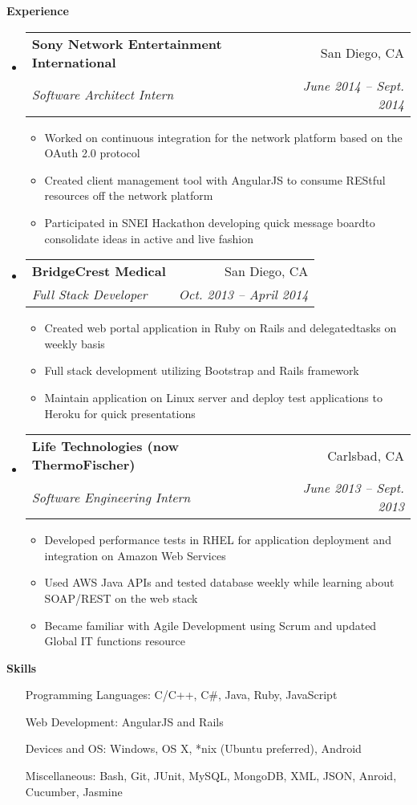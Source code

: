 \documentclass[letterpaper,11pt]{article}
\makeatletter
\newcommand{\resitem}[1]{\item #1 \vspace{-2pt}}
\newcommand{\resheading}[1]{{\large \colorbox{mygrey}{\begin{minipage}{\textwidth}{\textbf{#1 \vphantom{p\^{E}}}}\end{minipage}}}}
\newcommand{\ressubheading}[4]{
\begin{tabular*}{6.5in}{l@{\extracolsep{\fill}}r}
		\textbf{#1} & #2 \\
		\textit{#3} & \textit{#4} \\
\end{tabular*}\vspace{-6pt}}
\makeatother
\begin{document}
\resheading{Experience}
  \begin{itemize}
    \item 
      \ressubheading{Sony Network Entertainment International}{San Diego, CA}{Software Architect Intern}{June 2014 -- Sept. 2014}
      { \footnotesize
        \begin{itemize}
          \resitem{Worked on continuous integration for the network platform based on the OAuth 2.0 protocol}
	  \resitem{Created client management tool with AngularJS to consume REStful resources off the network platform}
          \resitem{Participated in SNEI Hackathon developing quick message boardto consolidate ideas in active and live fashion}
        \end{itemize}
      }
    \item
      \ressubheading{BridgeCrest Medical}{San Diego, CA}{Full Stack Developer}{Oct. 2013 -- April 2014}
      { \footnotesize
        \begin{itemize}
	  \resitem{Created web portal application in Ruby on Rails and delegatedtasks on weekly basis}
	  \resitem{Full stack development utilizing Bootstrap and Rails
framework}	
          \resitem{Maintain application on Linux server and deploy test applications to Heroku for quick presentations}
	\end{itemize}
      }
    \item
      \ressubheading{Life Technologies (now ThermoFischer)}{Carlsbad, CA}{Software Engineering Intern}{June 2013 -- Sept. 2013}
        { \footnotesize
	  \begin{itemize}
	    \resitem{Developed performance tests in RHEL for application deployment and integration on Amazon Web Services}
	    \resitem{Used AWS Java APIs and tested database weekly while learning about SOAP/REST on the web stack}
	    \resitem{Became familiar with Agile Development using Scrum and updated Global IT functions resource}
          \end{itemize}
        }
  \end{itemize}  %

\resheading{{Skills}}
  \begin{itemize}
    \item[Programming Languages:]
    { \footnotesize
      C/C++, C\#, Java, Ruby, JavaScript
    }
    \item[Web Development:]
    { \footnotesize
      AngularJS and Rails
    }
    \item[Devices and OS:]
    { \footnotesize
      Windows, OS X, *nix (Ubuntu preferred), Android
    }
    \item[Miscellaneous:]
    { \footnotesize
      Bash, Git, JUnit, MySQL, MongoDB, XML, JSON, Anroid, Cucumber, Jasmine
    }
  \end{itemize} %
\end{document}
